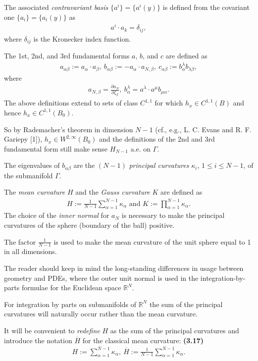 \documentclass{book}
\numberwithin{equation}{section}
\begin{document}
\begin{enumerate}
    The associated \textit{contravariant basis} $\{a^i\} = \{a^i(y)\}$ is defined from the covariant one $\{a_i\} = \{a_i(y)\}$ as
    \begin{align*}
        a^i\cdot a_k = \delta_{ij},
    \end{align*}
    where $\delta_{ij}$ is the Kronecker index function.
    
    The 1st, 2nd, and 3rd fundamental forms $a$, $b$, and $c$ are defined as
    \begin{align*}
        a_{\alpha\beta} := a_\alpha\cdot a_\beta,\ b_{\alpha\beta} := -a_\alpha\cdot a_{N,\beta},\ c_{\alpha\beta} := b_{\alpha}^\lambda b_{\lambda\beta},
    \end{align*}
    where
    \begin{align*}
        a_{N,\beta} = \frac{\partial a_N}{\partial\zeta_\beta},\ b_\alpha^\lambda = a^\lambda\cdot a^\mu b_{\mu\alpha}.
    \end{align*}
    The above definitions extend to sets of class $C^{1,1}$ for which $h_x\in C^{1,1}(B)$ and hence $h_x\in C^{1,1}(B_0)$.
    
    So by Rademacher's theorem in dimension $N - 1$ (cf., e.g., L. C. Evans and R. F. Gariepy [1]), $h_x\in W^{2,\infty}(B_0)$ and the definitions of the 2nd and 3rd fundamental form still make sense $H_{N-1}$ a.e. on $\Gamma$.
    
    The eigenvalues of $b_{\alpha\beta}$ are the $(N - 1)$ \textit{principal curvatures} $\kappa_i$, $1\le i\le N - 1$, of the submanifold $\Gamma$.
    
    The \textit{mean curvature} $H$ and the \textit{Gauss curvature} $K$ are defined as
    \begin{align*}
        H := \frac{1}{N - 1}\sum_{\alpha = 1}^{N - 1} \kappa_\alpha \mbox{ and } K := \prod_{\alpha = 1}^{N - 1} \kappa_\alpha.
    \end{align*} 
    The choice of the \textit{inner normal} for $a_N$ is necessary to make the principal curvatures of the sphere (boundary of the ball) positive.
    
    The factor $\frac{1}{N - 1}$ is used to make the mean curvature of the unit sphere equal to 1 in all dimensions.
    
    The reader should keep in mind the long-standing differences in usage between geometry and PDEs, where the outer unit normal is used in the integration-by-parts formulae for the Euclidean space $\mathbb{R}^N$.
    
    For integration by parts on submanifolds of $\mathbb{R}^N$ the sum of the principal curvatures will naturally occur rather than the mean curvature.
    
    It will be convenient to \textit{redefine} $H$ as the sum of the principal curvatures and introduce the notation $\overline{H}$ for the classical mean curvature: \textbf{(3.17)}
    \begin{align*}
        H := \sum_{\alpha = 1}^{N - 1} \kappa_\alpha,\ \overline{H} := \frac{1}{N - 1}\sum_{\alpha = 1}^{N - 1} \kappa_\alpha.
    \end{align*}
\end{enumerate}
\end{document}
